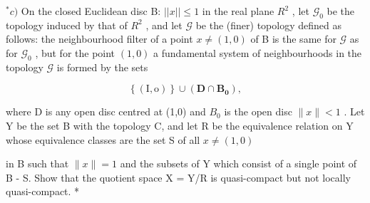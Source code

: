 \(^{*}c)\) On the closed Euclidean disc B: \(||x|| \leqslant 1\) in the real plane \(R^{2}\) , let \(\mathcal{G}_{0}\) be the topology induced by that of \(R^{2}\) , and let \(\mathcal{G}\) be the (finer) topology defined as follows: the neighbourhood filter of a point \(x \neq (1,0)\) of B is the same for \(\mathcal{G}\) as for \(\mathcal{G}_{0}\) , but for the point \((1,0)\) a fundamental system of neighbourhoods in the topology \(\mathcal{G}\) is formed by the sets

\[
\left\{\left(\mathrm{I}, \mathrm{o}\right) \right\} \cup \left(\mathbf {D} \cap \mathbf {B} _ {\mathbf {0}}\right),
\]

where D is any open disc centred at (1,0) and \(B_{0}\) is the open disc \(\|x\|<1\) . Let Y be the set B with the topology C, and let R be the equivalence relation on Y whose equivalence classes are the set S of all \(x\neq(1,0)\)

in B such that \(\|x\| = 1\) and the subsets of Y which consist of a single point of B - S. Show that the quotient space X = Y/R is quasi-compact but not locally quasi-compact. *

